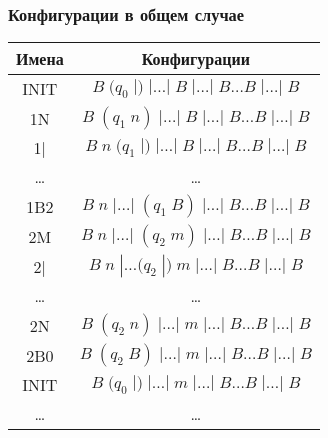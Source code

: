 \documentclass[a4paper, 12pt]{article}  %
\theoremstyle{definition}
\begin{document}
	\subsubsection*{Конфигурации в общем случае}
	
	\begin{tabular}{ | c | c | }
		\hline
		Имена & Конфигурации \\ 
		\hline
		INIT & $B \; (q_0 \; |) \; | \dots | \; B\; |\dots| \; B \dots B \; | \dots | \; B$ \\
		1N & $B \; (q_1 \; n) \; | \dots | \; B\; |\dots| \; B \dots B \; | \dots | \; B$ \\
		1| & $B \;  n \; (q_1 \; |) \; | \dots | \; B\; |\dots| \; B \dots B \; | \dots | \; B$ \\
		\dots & \dots \\
		1B2 & $B \;  n \;  | \dots| \; (q_1 \; B)\; |\dots| \; B \dots B \; | \dots | \; B$ \\
		2M & $B \;  n \;  | \dots| \; (q_2 \; m)\; |\dots| \; B \dots B \; | \dots | \; B$ \\
		2| & $B \;  n \;  | \dots (q_2 \; |) \; m\; |\dots| \; B \dots B \; | \dots | \; B$ \\
		\dots & \dots \\
		2N & $B \; (q_2 \; n) \;  | \dots  | \; m\; |\dots| \; B \dots B \; | \dots | \; B$ \\
		2B0 & $B \; (q_2 \; B) \;  | \dots  | \; m\; |\dots| \; B \dots B \; | \dots | \; B$ \\
		INIT & $B \; (q_0 \; |) \; | \dots  | \; m\; |\dots| \; B \dots B \; | \dots | \; B$ \\
		\dots & \dots \\

\end{tabular}
\end{document}
